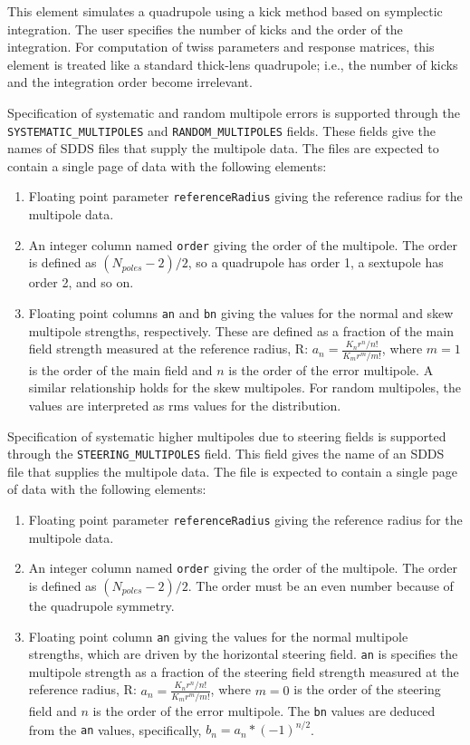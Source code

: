 This element simulates a quadrupole using a kick method based on
symplectic integration.  The user specifies the number of kicks and
the order of the integration.  For computation of twiss parameters and
response matrices, this element is treated like a standard thick-lens
quadrupole; i.e., the number of kicks and the integration order become
irrelevant.

\begin{raggedright}
Specification of systematic and random multipole errors is supported
through the \verb|SYSTEMATIC_MULTIPOLES| and 
\verb|RANDOM_MULTIPOLES|
fields.  These fields give the names of SDDS files that supply the
multipole data.  The files are expected to contain a single page of
data with the following elements:
\end{raggedright}
\begin{enumerate}
\item Floating point parameter {\tt referenceRadius} giving the reference
 radius for the multipole data.
\item An integer column named {\tt order} giving the order of the multipole.
The order is defined as $(N_{poles}-2)/2$, so a quadrupole has order 1, a
sextupole has order 2, and so on.
\item Floating point columns {\tt an} and {\tt bn} giving the values for the
normal and skew multipole strengths, respectively.  These are defined as a fraction 
of the main field strength measured at the reference radius, R: 
$a_n  = \frac{K_n r^n / n!}{K_m r^m / m!}$, where 
$m=1$ is the order of the main field and $n$ is the order of the error multipole.
A similar relationship holds for the skew multipoles.
For random multipoles, the values are interpreted as rms values for the distribution.
\end{enumerate}

Specification of systematic higher multipoles due to steering fields is
supported through the \verb|STEERING_MULTIPOLES| field.  This field gives the
name of an SDDS file that supplies the multipole data.  The file is
expected to contain a single page of data with the following elements:
\begin{enumerate}
\item Floating point parameter {\tt referenceRadius} giving the reference
 radius for the multipole data.
\item An integer column named {\tt order} giving the order of the multipole.
The order is defined as $(N_{poles}-2)/2$.  The order must be an even number
because of the quadrupole symmetry.
\item Floating point column {\tt an} giving the values for the normal
multipole strengths, which are driven by the horizontal steering field.
{\tt an} is specifies the multipole strength as a fraction of the steering field strength measured at the reference radius, R: 
$a_n  = \frac{K_n r^n / n!}{K_m r^m / m!}$, where 
$m=0$ is the order of the steering field and $n$ is the order of the error multipole.
The {\tt bn} values are deduced from the {\tt an} values, specifically,
$b_n = a_n*(-1)^{n/2}$.
\end{enumerate}

